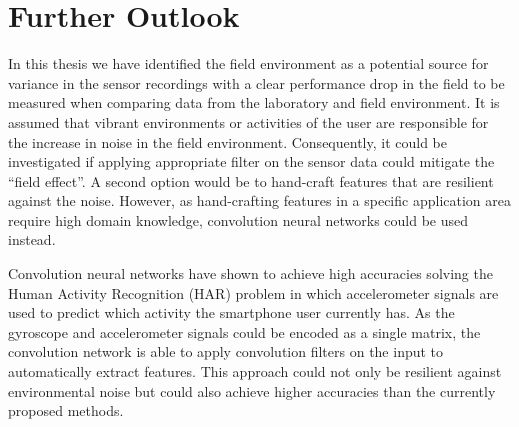 \section{Further Outlook}
In this thesis we have identified the field environment as a potential source for variance in the sensor recordings with a clear performance drop in the field to be measured when comparing data from the laboratory and field environment. It is assumed that vibrant environments or activities of the user are responsible for the increase in noise in the field environment. Consequently, it could be investigated if applying appropriate filter on the sensor data could mitigate the ``field effect''. A second option would be to hand-craft features that are resilient against the noise. However, as hand-crafting features in a specific application area require high domain knowledge, convolution neural networks could be used instead.

Convolution neural networks have shown to achieve high accuracies solving the Human Activity Recognition (HAR) problem \cite{zeng2014convolutional} in which accelerometer signals are used to predict which activity the smartphone user currently has. As the gyroscope and accelerometer signals could be encoded as a single matrix, the convolution network is able to apply convolution filters on the input to automatically extract features. This approach could not only be resilient against environmental noise but could also achieve higher accuracies than the currently proposed methods.


